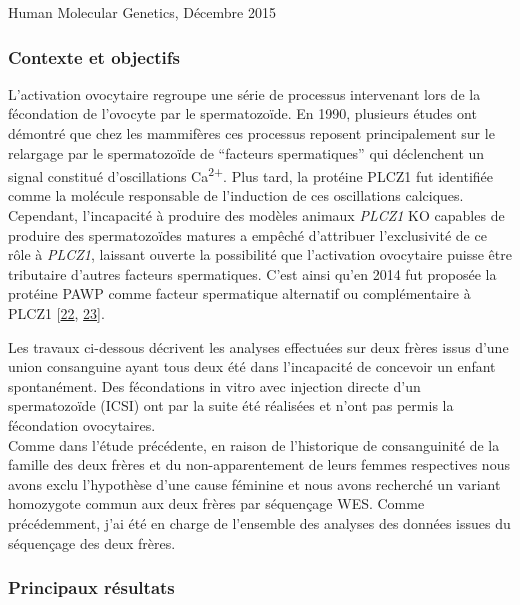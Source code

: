 \documentclass[12pt,a4paper,twoside]{ugathesis}
\begin{document}
Human Molecular Genetics, Décembre 2015

\newpage

\subsubsection{Contexte et objectifs}\label{contexte-et-objectifs-1}

L'activation ovocytaire regroupe une série de processus intervenant lors
de la fécondation de l'ovocyte par le spermatozoïde. En 1990, plusieurs
études ont démontré que chez les mammifères ces processus reposent
principalement sur le relargage par le spermatozoïde de ``facteurs
spermatiques'' qui déclenchent un signal constitué d'oscillations
Ca\textsuperscript{2+}. Plus tard, la protéine PLCZ1 fut identifiée
comme la molécule responsable de l'induction de ces oscillations
calciques. Cependant, l'incapacité à produire des modèles animaux
\emph{PLCZ1} KO capables de produire des spermatozoïdes matures a
empêché d'attribuer l'exclusivité de ce rôle à \emph{PLCZ1}, laissant
ouverte la possibilité que l'activation ovocytaire puisse être
tributaire d'autres facteurs spermatiques. C'est ainsi qu'en 2014 fut
proposée la protéine PAWP comme facteur spermatique alternatif ou
complémentaire à PLCZ1 {[}\protect\hyperlink{ref-Aarabi2014}{22},
\protect\hyperlink{ref-Aarabi2014a}{23}{]}.

Les travaux ci-dessous décrivent les analyses effectuées sur deux frères
issus d'une union consanguine ayant tous deux été dans l'incapacité de
concevoir un enfant spontanément. Des fécondations in vitro avec
injection directe d'un spermatozoïde (ICSI) ont par la suite été
réalisées et n'ont pas permis la fécondation ovocytaires.\\
Comme dans l'étude précédente, en raison de l'historique de
consanguinité de la famille des deux frères et du non-apparentement de
leurs femmes respectives nous avons exclu l'hypothèse d'une cause
féminine et nous avons recherché un variant homozygote commun aux deux
frères par séquençage WES. Comme précédemment, j'ai été en charge de
l'ensemble des analyses des données issues du séquençage des deux
frères.

\newpage



\newpage

\subsubsection{Principaux résultats}\label{principaux-resultats-1}
\end{document}
